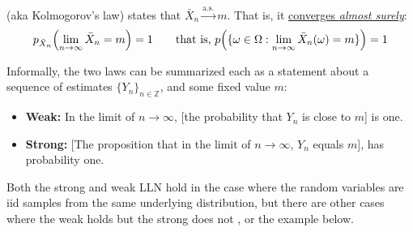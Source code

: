 \documentclass[a4paper]{article}
\theoremstyle{definition}
\newcommand\key\uline%
\renewcommand\right\mright%
\renewcommand\left\mleft%
\begin{document}
(aka Kolmogorov's law) states that
$\bar{X}_n\xrightarrow{\text{a.s.}} m$.
That is, it \key{converges \emph{almost surely}}:
\begin{equation*}
  p_{\bar{X}_n}\left( \lim_{n\to\infty}\bar{X}_n = m \right) = 1
  \qquad\text{that is, }
  p\left(\{\omega\in\Omega\mathrel{:} \lim_{n\to\infty}\bar{X}_n(\omega) = m \}\right) = 1
\end{equation*}

Informally, the two laws can be summarized each as a statement about a sequence of
estimates $\{Y_n\}_{n\in\mathbb Z}$, and some fixed value $m$:
\begin{itemize}
  \item \textbf{Weak:} In the limit of $n\to\infty$, [the probability that $Y_n$
    is close to $m$] is one.
  \item \textbf{Strong:} [The proposition that in the limit of $n\to\infty$,
    $Y_n$ equals $m$], has probability one.
\end{itemize}

Both the strong and weak LLN hold in the case where the random variables are iid
samples from the same underlying distribution, but there are other cases
where the weak holds but the strong does not
\citep[see][Example 5.4, p.71]{billingsley.p:1995}, or the example below.
\end{document}
